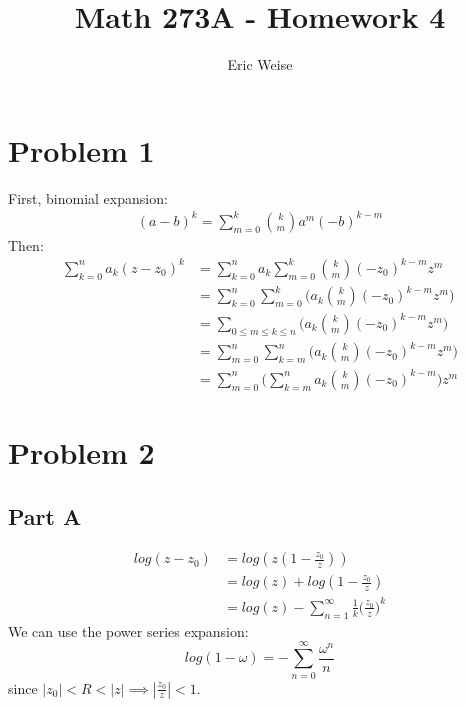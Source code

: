 \documentclass{article}
\title{Math 273A - Homework 4}
\author{Eric Weise}
\begin{document}
\maketitle

\section*{Problem 1}
First, binomial expansion:
\begin{align*}
    (a-b)^k = \sum_{m=0}^{k} \binom{k}{m}a^m(-b)^{k-m}
\end{align*}
Then:
\begin{align*}
    \sum_{k=0}^{n} a_k (z - z_0)^k
    &= \sum_{k=0}^{n} a_k \sum_{m=0}^{k} \binom{k}{m} (-z_0)^{k-m} z^m \\
    &= \sum_{k=0}^{n} \sum_{m=0}^{k} \bigg( a_k \binom{k}{m} (-z_0)^{k-m} z^m \bigg) \\
    &= \sum_{0 \leq m \leq k \leq n}\bigg(  a_k \binom{k}{m} (-z_0)^{k-m} z^m \bigg) \\
    &= \sum_{m=0}^{n} \sum_{k=m}^{n} \bigg( a_k \binom{k}{m} (-z_0)^{k-m} z^m \bigg) \\
    &= \sum_{m=0}^{n} \bigg( \sum_{k=m}^{n} a_k \binom{k}{m} (-z_0)^{k-m} \bigg) z^m
\end{align*}

\section*{Problem 2}
\subsection*{Part A}
\begin{align*}
    log(z - z_0)
    &= log(z(1 - \frac{z_0}{z})) \\
    &= log(z) + log(1 - \frac{z_0}{z}) \\
    &= log(z) - \sum_{n=1}^{\infty}\frac{1}{k}\bigg(\frac{z_0}{z}\bigg)^k
\end{align*}
We can use the power series expansion:
\[ log(1-\omega) = -\sum_{n=0}^{\infty}\frac{\omega^n}{n} \] 
since $|z_0|<R<|z| \implies |\frac{z_0}{z}| < 1$.
\end{document}
